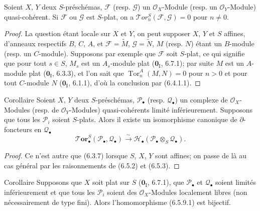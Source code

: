 \begin{proposition}[6.5.8]
Soient $X$, $Y$ deux $S$-préschémas, $\mathscr F$ \textup{(resp.} $\mathscr G$\textup{)} un
$\mathscr O_X$-Module \textup{(resp.} un $\mathscr O_Y$-Module\textup{)} quasi-cohérent. Si
$\mathscr F$ ou $\mathscr G$ est $S$-plat, on a
$\mathscr{T}\!or_n^S(\mathscr F,\mathscr G)=0$ pour $n\neq0$.
\end{proposition}

\begin{proof}
La question étant locale sur $X$ et $Y$, on peut supposer $X$, $Y$ et $S$
affines, d'anneaux respectifs $B$, $C$, $A$, et
$\mathscr F=\widetilde M$, $\mathscr G=\widetilde N$, $M$ (resp. $N$) étant
un $B$-module (resp. un $C$-module). Supposons par exemple que $\mathscr F$
soit $S$-plat, ce qui signifie que pour tout $s\in S$, $M_s$ est un
$A_s$-module plat ($\mathbf{0}_{\mathrm I}$, 6.7.1); par suite $M$ est un $A$-module plat
($\mathbf{0}_{\mathrm I}$, 6.3.3), et l'on sait que
$\operatorname{Tor}_n^A(M,N)=0$ pour $n>0$ et pour tout $C$-module $N$
($\mathbf{0}_{\mathrm I}$, 6.1.1), d'où la conclusion par (6.4.1.1).
\end{proof}

\begin{namedtheorem}[6.5.9]{Corollaire}
Soient $X$, $Y$ deux $S$-préschémas, $\mathscr P_\bullet$ \textup{(resp.}
$\mathscr Q_\bullet$\textup{)} un complexe de
$\mathscr O_X$-Modules \textup{(resp.} de $\mathscr O_Y$-Modules\textup{)} quasi-cohérents limité
inférieurement. Supposons que tous les $\mathscr P_i$ soient $S$-plats. Alors
il existe un isomorphisme canonique de $\partial$-foncteurs en
$\mathscr Q_\bullet$
\[
  \boldsymbol{\mathscr{T}\!or}_\bullet^S(\mathscr P_\bullet,\mathscr Q_\bullet)
  \xrightarrow{\sim}
  \mathscr H_\bullet(\mathscr P_\bullet\otimes_S\mathscr Q_\bullet).
  \tag{6.5.9.1}\label{III.6.5.9.1.fr}
\]
\end{namedtheorem}

\begin{proof}
Ce n'est autre que (6.3.7) lorsque $S$, $X$, $Y$ sont affines; on passe de là
au cas général par les raisonnements de (6.5.2) et (6.5.3).
\end{proof}

\begin{namedtheorem}[6.5.10]{Corollaire}
Supposons que $X$ soit plat sur $S$ \textup{($\mathbf{0}_{\mathrm I}$, 6.7.1)}, que
$\mathscr P_\bullet$ et $\mathscr Q_\bullet$ soient limités inférieurement et
que tous les $\mathscr P_i$ soient des $\mathscr O_X$-Modules localement
libres (non nécessairement de type fini). Alors l'homomorphisme \textup{(6.5.9.1)} est
bijectif.
\end{namedtheorem}

